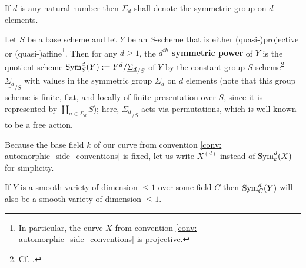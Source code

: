         \begin{convention} \label{conv: symmetric_group}
            If $d$ is any natural number then $\Sigma_d$ shall denote the symmetric group on $d$ elements.
        \end{convention}
        \begin{definition} \label{def: symmetric_powers_of_schemes}
            Let $S$ be a base scheme and let $Y$ be an $S$-scheme that is either (quasi-)projective or (quasi-)affine\footnote{In particular, the curve $X$ from convention \ref{conv: automorphic_side_conventions} is projective.}. Then for any $d \geq 1$, the \textbf{$d^{th}$ symmetric power} of $Y$ is the quotient scheme $\mathrm{Sym}^d_S(Y) := Y^d/\underline{\Sigma_d}_{/S}$ of $Y$ by the constant group $S$-scheme\footnote{Cf. \cite[\href{https://stacks.math.columbia.edu/tag/03YW}{Tag 03YW}]{stacks}.} $\underline{\Sigma_d}_{/S}$ with values in the symmetric group $\Sigma_d$ on $d$ elements (note that this group scheme is finite, flat, and locally of finite presentation over $S$, since it is represented by $\coprod_{\sigma \in \Sigma_d} S$); here, $\underline{\Sigma_d}_{/S}$ acts via permutations, which is well-known to be a free action.
        \end{definition}
        \begin{convention}
            Because the base field $k$ of our curve from convention \ref{conv: automorphic_side_conventions} is fixed, let us write $X^{(d)}$ instead of $\mathrm{Sym}^d_k(X)$ for simplicity.
        \end{convention}
        \begin{lemma} \label{lemma: smoothness_of_symmetric_powers}
            If $Y$ is a smooth variety of dimension $\leq 1$ over some field $C$ then $\mathrm{Sym}_C^d(Y)$ will also be a smooth variety of dimension $\leq 1$.
        \end{lemma}
